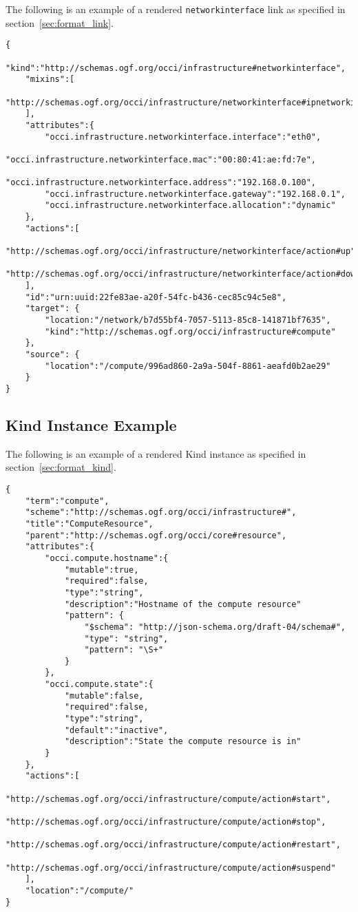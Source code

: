 \documentclass[10pt,a4paper]{article}
\begin{document}
\begin{appendices}
The following is an example of a rendered \texttt{networkinterface} link as specified in section~\ref{sec:format_link}.


\begin{lstlisting}
{
    "kind":"http://schemas.ogf.org/occi/infrastructure#networkinterface",
    "mixins":[
        "http://schemas.ogf.org/occi/infrastructure/networkinterface#ipnetworkinterface"
    ],
    "attributes":{
        "occi.infrastructure.networkinterface.interface":"eth0",
        "occi.infrastructure.networkinterface.mac":"00:80:41:ae:fd:7e",
        "occi.infrastructure.networkinterface.address":"192.168.0.100",
        "occi.infrastructure.networkinterface.gateway":"192.168.0.1",
        "occi.infrastructure.networkinterface.allocation":"dynamic"
    },
    "actions":[
        "http://schemas.ogf.org/occi/infrastructure/networkinterface/action#up",
        "http://schemas.ogf.org/occi/infrastructure/networkinterface/action#down"
    ],
    "id":"urn:uuid:22fe83ae-a20f-54fc-b436-cec85c94c5e8",
    "target": {
        "location:"/network/b7d55bf4-7057-5113-85c8-141871bf7635",
        "kind":"http://schemas.ogf.org/occi/infrastructure#compute"
    },
    "source": {
        "location":"/compute/996ad860-2a9a-504f-8861-aeafd0b2ae29"
    }
}
\end{lstlisting}

\subsection{Kind Instance Example}
\label{kind_instance_rendering_example}

The following is an example of a rendered Kind instance as specified in section~\ref{sec:format_kind}.

\begin{lstlisting}
{
    "term":"compute",
    "scheme":"http://schemas.ogf.org/occi/infrastructure#",
    "title":"ComputeResource",
    "parent":"http://schemas.ogf.org/occi/core#resource",
    "attributes":{
        "occi.compute.hostname":{
            "mutable":true,
            "required":false,
            "type":"string",
            "description":"Hostname of the compute resource"
            "pattern": {
                "$schema": "http://json-schema.org/draft-04/schema#",
                "type": "string",
                "pattern": "\S+"
            }
        },
        "occi.compute.state":{
            "mutable":false,
            "required":false,
            "type":"string",
            "default":"inactive",
            "description":"State the compute resource is in"
        }
    },
    "actions":[
        "http://schemas.ogf.org/occi/infrastructure/compute/action#start",
        "http://schemas.ogf.org/occi/infrastructure/compute/action#stop",
        "http://schemas.ogf.org/occi/infrastructure/compute/action#restart",
        "http://schemas.ogf.org/occi/infrastructure/compute/action#suspend"
    ],
    "location":"/compute/"
}
\end{lstlisting}


\end{appendices}
\end{document}
